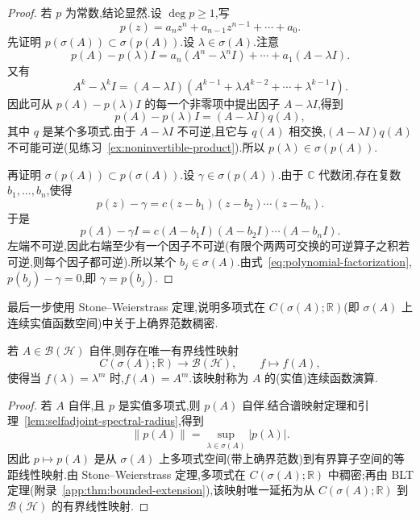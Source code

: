 \begin{proof}
若 \(p\) 为常数,结论显然.设 \(\deg p\geq1\),写
\[
p(z)=a_{n}z^{n}+a_{n-1}z^{n-1}+\cdots+a_{0}.
\]
先证明 \(p(\sigma(A))\subset\sigma(p(A))\).设 \(\lambda\in\sigma(A)\).注意
\[
p(A)-p(\lambda)I
=a_{n}(A^{n}-\lambda^{n}I)+\cdots+a_{1}(A-\lambda I).
\]
又有
\[
A^{k}-\lambda^{k}I
=(A-\lambda I)(A^{k-1}+\lambda A^{k-2}+\cdots+\lambda^{k-1}I).
\]
因此可从 \(p(A)-p(\lambda)I\) 的每一个非零项中提出因子 \(A-\lambda I\),得到
\[
p(A)-p(\lambda)I=(A-\lambda I)q(A),
\]
其中 \(q\) 是某个多项式.由于 \(A-\lambda I\) 不可逆,且它与 \(q(A)\) 相交换,\((A-\lambda I)q(A)\) 不可能可逆(见练习~\ref{ex:noninvertible-product}).所以 \(p(\lambda)\in\sigma(p(A))\).

再证明 \(\sigma(p(A))\subset p(\sigma(A))\).设 \(\gamma\in\sigma(p(A))\).由于 \(\mathbb{C}\) 代数闭,存在复数 \(b_{1},\ldots,b_{n}\),使得
\[
p(z)-\gamma=c(z-b_{1})(z-b_{2})\cdots(z-b_{n}).
\label{eq:polynomial-factorization}
\]
于是
\[
p(A)-\gamma I=c(A-b_{1}I)(A-b_{2}I)\cdots(A-b_{n}I).
\]
左端不可逆,因此右端至少有一个因子不可逆(有限个两两可交换的可逆算子之积若可逆,则每个因子都可逆).所以某个 \(b_{j}\in\sigma(A)\).由式~\eqref{eq:polynomial-factorization},\(p(b_{j})-\gamma=0\),即 \(\gamma=p(b_{j})\).
\end{proof}

最后一步使用 Stone--Weierstrass 定理,说明多项式在 \(C(\sigma(A);\mathbb{R})\)(即 \(\sigma(A)\) 上连续实值函数空间)中关于上确界范数稠密.

\begin{proposition}[连续函数演算]\label{prop:continuous-functional-calculus}
若 \(A\in\mathcal{B}(\mathcal{H})\) 自伴,则存在唯一有界线性映射
\[
C(\sigma(A);\mathbb{R})\longrightarrow\mathcal{B}(\mathcal{H}),\qquad f\longmapsto f(A),
\]
使得当 \(f(\lambda)=\lambda^{m}\) 时,\(f(A)=A^{m}\).该映射称为 \(A\) 的(实值)连续函数演算.
\end{proposition}

\begin{proof}
若 \(A\) 自伴,且 \(p\) 是实值多项式,则 \(p(A)\) 自伴.结合谱映射定理和引理~\ref{lem:selfadjoint-spectral-radius},得到
\[
\|p(A)\|=\sup_{\lambda\in\sigma(A)}|p(\lambda)|.
\label{eq:polynomial-functional-calculus-isometry}
\]
因此 \(p\mapsto p(A)\) 是从 \(\sigma(A)\) 上多项式空间(带上确界范数)到有界算子空间的等距线性映射.由 Stone--Weierstrass 定理,多项式在 \(C(\sigma(A);\mathbb{R})\) 中稠密;再由 BLT 定理(附录~\ref{app:thm:bounded-extension}),该映射唯一延拓为从 \(C(\sigma(A);\mathbb{R})\) 到 \(\mathcal{B}(\mathcal{H})\) 的有界线性映射.
\end{proof}


